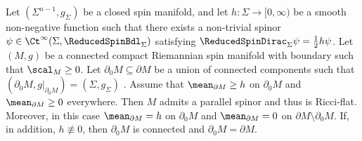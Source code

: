 \documentclass[a4paper,11pt]{amsart}
\numberwithin{equation}{section}
\begin{document}
\begin{proposition}\label{prop:spinor_extension}
    Let \((\Sigma^{n-1},g_\Sigma)\) be a closed spin manifold, and let \(h \colon \Sigma \to [0,\infty)\) be a smooth non-negative function such that there exists a non-trivial spinor \(\psi \in \Ct^\infty(\Sigma, \ReducedSpinBdl_\Sigma)\) satisfying \(\ReducedSpinDirac_\Sigma \psi = \frac{1}{2} h \psi\).
    Let \((M,g)\) be a connected compact Riemannian spin manifold with boundary such that \(\scal_M \geq 0\).
    Let \(\partial_0 M \subseteq \partial M\) be a union of connected components such that \((\partial_0 M,g|_{\partial_0 M})=(\Sigma,g_\Sigma)\) .
    Assume that \(\mean_{\partial M} \geq h\) on \(\partial_0 M\) and \(\mean_{\partial M} \geq 0\) everywhere.
    Then \(M\) admits a parallel spinor and thus is Ricci-flat. Moreover, in this case \(\mean_{\partial M} = h\) on \(\partial_0 M\) and \(\mean_{\partial M}=0\) on \(\partial M \setminus \partial_0 M\).
    If, in addition, \(h \not\equiv 0\), then \(\partial_0 M\) is connected and \(\partial_0 M = \partial M\).
\end{proposition}
\end{document}
